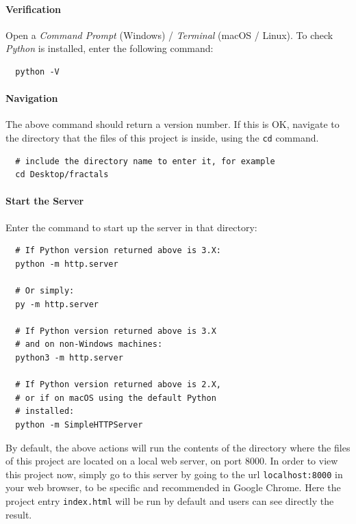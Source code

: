 \paragraph{Verification}

Open a \emph{Command Prompt} (Windows) / \emph{Terminal} (macOS / Linux). To check \emph{Python} is installed, enter the following command:

\begin{verbatim}
  python -V
\end{verbatim}

\paragraph{Navigation}

The above command should return a version number. If this is OK, navigate to the directory that the files of this project is inside, using the \texttt{cd} command.

\begin{verbatim}
  # include the directory name to enter it, for example
  cd Desktop/fractals
\end{verbatim}

\paragraph{Start the Server}

Enter the command to start up the server in that directory:

\begin{verbatim}
  # If Python version returned above is 3.X:
  python -m http.server
  
  # Or simply:
  py -m http.server

  # If Python version returned above is 3.X
  # and on non-Windows machines:
  python3 -m http.server

  # If Python version returned above is 2.X,
  # or if on macOS using the default Python
  # installed:
  python -m SimpleHTTPServer
\end{verbatim}

By default, the above actions will run the contents of the directory where the files of this project are located on a local web server, on port $8000$. In order to view this project now, simply go to this server by going to the \gls{url} \texttt{localhost:8000} in your web browser, to be specific and recommended in Google Chrome. Here the project entry \texttt{index.html} will be run by default and users can see directly the result.

